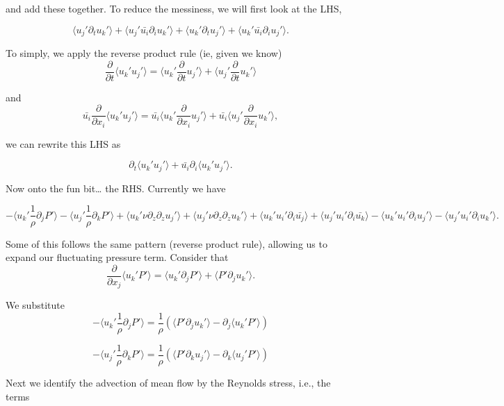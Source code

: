 \documentclass[
  letterpaper,
  DIV=11,
  numbers=noendperiod]{scrartcl}
\begin{document}
and add these together. To reduce the messiness, we will first look at
the LHS,

\begin{equation}
     \langle u_j' \partial_t u_k' \rangle  +
     \langle u_j' \bar{u_i} \partial_i u_k' \rangle  +
     \langle u_k' \partial_t u_j' \rangle  +
     \langle u_k' \bar{u_i} \partial_i u_j' \rangle.
\end{equation}

To simply, we apply the reverse product rule (ie, given we know)
\[ \frac{\partial}{\partial t} \langle u_k' u_j' \rangle               = \langle u_k' \frac{\partial}{\partial t}  u_j' \rangle + 
    \langle u_j' \frac{\partial}{\partial t}  u_k' \rangle \]

and
\[ \bar{u_i}\frac{\partial}{\partial x_i} \langle u_k' u_j' \rangle  = \bar{u_i} \langle u_k' \frac{\partial}{\partial x_i} u_j' \rangle  + \bar{u_i} \langle  u_j' \frac{\partial}{\partial x_i} u_k' \rangle,
\]

we can rewrite this LHS as

\[ \partial_t \langle u_k' u_j' \rangle  + \bar{u_i} \partial_i \langle u_k' u_j' \rangle. \]

Now onto the fun bit\ldots{} the RHS. Currently we have

\[ - \langle u_k' \frac{1}{\rho} \partial_j P' \rangle  
     - \langle u_j' \frac{1}{\rho} \partial_k P' \rangle  
    + \langle u_k' \nu \partial_z \partial_z u_j' \rangle  
   + \langle u_j' \nu \partial_z \partial_z u_k' \rangle  
    +   \langle u_k' u_i' \partial_i \bar{u_j} \rangle 
    + \langle u_j' u_i' \partial_i \bar{u_k} \rangle  
   -  \langle u_k' u_i' \partial_i u_j' \rangle  
  - \langle u_j' u_i' \partial_i u_k' \rangle . 
\]

Some of this follows the same pattern (reverse product rule), allowing
us to expand our fluctuating pressure term. Consider that
\[ \frac{\partial }{\partial x_j} \langle u_k' P' \rangle =
\langle u_k' \partial_j P' \rangle  + \langle P' \partial_j u_k' \rangle.\]

We substitute \[ - \langle u_k' \frac{1}{\rho} \partial_j P' \rangle = 
 \frac{1}{\rho} \left( \langle P' \partial_j u_k' \rangle - \partial_j \langle u_k' P' \rangle \right) \]

\[ - \langle u_j' \frac{1}{\rho} \partial_k P' \rangle = 
 \frac{1}{\rho} \left( \langle P' \partial_k u_j' \rangle - \partial_k \langle u_j' P' \rangle \right) \]

Next we identify the advection of mean flow by the Reynolds stress,
i.e., the terms
\end{document}
